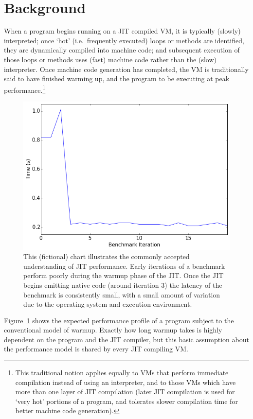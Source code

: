 \documentclass[10pt,preprint]{sigplanconf}
\begin{document}
\section{Background}
\label{sec:warmup}

When a program begins running on a JIT compiled VM, it is typically (slowly)
interpreted; once `hot' (i.e.~frequently executed) loops or methods are
identified, they are dynamically compiled into machine code; and subsequent
execution of those loops or methods uses (fast) machine code rather than the
(slow) interpreter. Once machine code generation has completed, the VM is
traditionally said to have finished warming up, and the program to be executing
at peak performance.\footnote{This traditional notion applies equally to VMs
that perform immediate compilation instead of using an interpreter, and to
those VMs which have more than one layer of JIT compilation (later JIT
compilation is used for `very hot' portions of a program, and tolerates slower
compilation time for better machine code generation).}

\begin{figure}[h!]
\centering
\includegraphics[width=.4\textwidth]{img/trad}
\caption{ This (fictional) chart illustrates the commonly accepted understanding
of JIT performance. Early iterations of a benchmark perform poorly during the
warmup phase of the JIT. Once the JIT begins emitting native code (around
iteration 3) the latency of the benchmark is consistently small, with a small
amount of variation due to the operating system and execution environment.}
\label{fig:trad}
\end{figure}

Figure~\ref{fig:trad} shows the expected performance profile of a
program subject to the conventional model of warmup. Exactly how long warmup
takes is highly dependent on
the program and the JIT compiler, but this basic assumption about the
performance model is shared by every JIT compiling VM.
\end{document}
